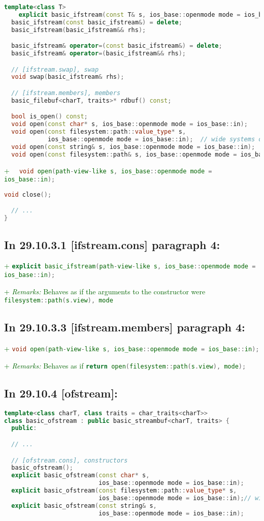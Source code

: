 \documentclass[11pt]{article}
\newcommand{\code}[2][cpp]{\lstinline[language=#1,basicstyle=\small\ttfamily]{#2}}
\newcommand{\desc}[1]{\textit{#1}}
\newcommand{\remarks}{\desc{Remarks: }}
\newcommand{\tsrefp}[3]{\subsection*{In #2 \textbf{[#1]} paragraph #3:}}
\newcommand{\tsref}[2]{\subsection*{In #2 \textbf{[#1]}:}}
\newcommand{\tsreplace}[3]{\textcolor{red}{\sout{#1}}#2\textcolor{darkgreen}{#3}}
\begin{document}
\begin{lstlisting}[language=cpp]
  template<class T>
    explicit basic_ifstream(const T& s, ios_base::openmode mode = ios_base::in);
  basic_ifstream(const basic_ifstream&) = delete;
  basic_ifstream(basic_ifstream&& rhs);

  basic_ifstream& operator=(const basic_ifstream&) = delete;
  basic_ifstream& operator=(basic_ifstream&& rhs);

  // [ifstream.swap], swap
  void swap(basic_ifstream& rhs);

  // [ifstream.members], members
  basic_filebuf<charT, traits>* rdbuf() const;

  bool is_open() const;
  void open(const char* s, ios_base::openmode mode = ios_base::in);
  void open(const filesystem::path::value_type* s,
            ios_base::openmode mode = ios_base::in);  // wide systems only; see [fstream.syn]
  void open(const string& s, ios_base::openmode mode = ios_base::in);
  void open(const filesystem::path& s, ios_base::openmode mode = ios_base::in);
\end{lstlisting}

\tsreplace{}{}{+ \code{  void open(path-view-like s, ios_base::openmode mode = ios_base::in);}}

\begin{lstlisting}[language=cpp]
  void close();

  // ...
}
\end{lstlisting}

\tsrefp{ifstream.cons}{29.10.3.1}{4}

\tsreplace{}{}{+ \code{explicit basic_ifstream(path-view-like s,
ios_base::openmode mode = ios_base::in);}}

\tsreplace{}{}{+ \remarks Behaves as if the arguments to the constructor were \code{filesystem::path(s.view), mode}}

\tsrefp{ifstream.members}{29.10.3.3}{4}

\tsreplace{}{}{+ \code{void open(path-view-like s, ios_base::openmode mode = ios_base::in);}}

\tsreplace{}{}{+ \remarks Behaves as if \code{return open(filesystem::path(s.view), mode);}}


\tsref{ofstream}{29.10.4}

\begin{lstlisting}[language=cpp]
template<class charT, class traits = char_traits<charT>>
class basic_ofstream : public basic_streambuf<charT, traits> {
  public:

  // ...

  // [ofstream.cons], constructors
  basic_ofstream();
  explicit basic_ofstream(const char* s,
                          ios_base::openmode mode = ios_base::in);
  explicit basic_ofstream(const filesystem::path::value_type* s,
                          ios_base::openmode mode = ios_base::in);// wide systems only; see [fstream.syn]
  explicit basic_ofstream(const string& s,
                          ios_base::openmode mode = ios_base::in);
\end{lstlisting}
\end{document}
